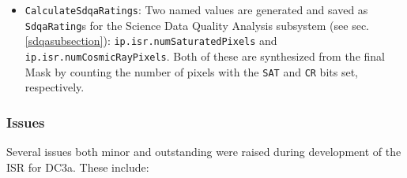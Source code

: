 \begin{itemize}
\item \texttt{CalculateSdqaRatings}: Two named values are generated
and saved as {\tt SdqaRating}s for the Science Data Quality Analysis
subsystem (see sec. \ref{sdqasubsection}):  
{\tt ip.isr.numSaturatedPixels} and {\tt ip.isr.numCosmicRayPixels}.
Both of these are synthesized from the final Mask by counting the
number of pixels with the {\tt SAT} and {\tt CR} bits set,
respectively.

\end{itemize}

\iffalse
%
%
\subsubsection{Results}

The only truly testable portion of the ISR during DC3a was the
identification and masking of the cosmic rays synthesized for the
second (i.e. exposure idenifier 1) images.  

\fi

\subsubsection{Issues}

Several issues both minor and outstanding were raised during
development of the ISR for DC3a.  These include:


